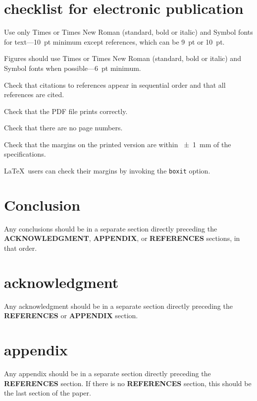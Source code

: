 \documentclass[letterpaper,  %
              ]{jacow-2_3}   %
\newcommand\SEC[1]{\textbf{\uppercase{#1}}}
\begin{document}
{{\section{checklist for electronic publication}

\begin{Itemize}
	\item  Use only Times or Times New Roman (standard, bold or italic) and Symbol
	fonts for text---\SI{10}{pt} minimum except references, which can be \SI{9}{pt} or \SI{10}{pt}.
	\item  Figures should use Times or Times New Roman (standard, bold or italic) and
	Symbol fonts when possible---\SI{6}{pt} minimum.
	\item  Check that citations to references appear in sequential order and
	that all references are cited.
	\item  Check that the PDF file prints correctly.
	\item  Check that there are no page numbers.
	\item  Check that the margins on the printed version are within \SI{\pm1}{mm}
	of the specifications.
	\item  \LaTeX\ users can check their margins by invoking the
	\texttt{boxit} option.
\end{Itemize}

\raggedend
\newpage

\section{Conclusion}

Any conclusions should be in a separate section directly preceding
the \SEC{Acknowledgment}, \SEC{Appendix}, or \SEC{References} sections, in that
order.

\section{acknowledgment}
Any acknowledgment should be in a separate section directly preceding
the \SEC{References} or \SEC{Appendix} section.


\section{appendix}
Any appendix should be in a separate section directly preceding
the \SEC{References} section. If there is no \SEC{References} section,
this should be the last section of the paper.

}}
\end{document}
